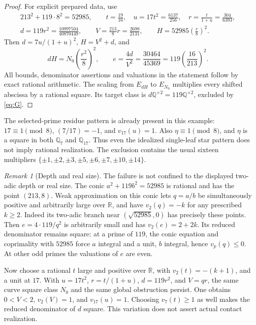 \documentclass[11pt]{article}
\newcommand{\Q}{\mathbb Q}
\theoremstyle{remark}\newtheorem{remark}[theorem]{Remark}
\begin{document}
\begin{proof}
For explicit prepared data, use
\begin{gather*}
 213^2+119\cdot8^2=52985,\qquad
 t=\frac{19}{16},\quad u=17t^2=\frac{6137}{256},\quad
 r=\frac{t}{1+u}=\frac{304}{6393},\\
 d=119r^2=\frac{10997504}{40870449},\qquad
 V=\frac{213}{8}r=\frac{2698}{2131},\qquad
 H=52985\left(\frac r8\right)^2.
\end{gather*}
Then \(d=7u/(1+u)^2\), \(H=V^2+d\), and
\[
 dH=N_0\left(\frac{r^2}{8}\right)^2,
 \qquad e=\frac{4d}{V^2}=\frac{30464}{45369}
                    =119\left(\frac{16}{213}\right)^2.
\]
All bounds, denominator assertions and valuations in the statement follow
by exact rational arithmetic. The scaling from \(E_{dH}\) to \(E_{N_0}\)
multiplies every shifted abscissa by a rational square. Its target class
is \(d\Q^{\times2}=119\Q^{\times2}\), excluded by \eqref{eq:G}.
\end{proof}

The selected-prime residue pattern is already present in this example:
\(17\equiv1\pmod8\), \((7/17)=-1\), and \(v_{17}(u)=1\).
Also \(\eta\equiv1\pmod8\), and \(\eta\) is a square in both
\(\Q_7\) and \(\Q_{17}\). Thus even the idealized single-leaf star
pattern does not imply rational realization. The exclusion contains the
usual sixteen multipliers
\(\{\pm1,\pm2,\pm3,\pm5,\pm6,\pm7,\pm10,\pm14\}\).

\begin{remark}[Depth and real size]
The failure is not confined to the displayed two-adic depth or real size.
The conic \(a^2+119b^2=52985\) is rational and has the point \((213,8)\).
Weak approximation on this conic lets \(q=a/b\) be simultaneously positive
and arbitrarily large over \(\mathbb R\), and have \(v_2(q)=-k\) for
any prescribed \(k\ge2\). Indeed its two-adic branch near
\((\sqrt{52985},0)\) has precisely these points. Then
\(e=4\cdot119/q^2\) is arbitrarily small and has
\(v_2(e)=2+2k\). Its reduced denominator remains square: at a prime
of \(119\), the conic equation and coprimality with \(52985\) force
\(a\) integral and a unit, \(b\) integral, hence \(v_p(q)\le0\).
At other odd primes the valuations of \(e\) are even.

Now choose a rational \(t\) large and positive over \(\mathbb R\), with
\(v_2(t)=-(k+1)\), and a unit at \(17\). With
\(u=17t^2\), \(r=t/(1+u)\), \(d=119r^2\), and \(V=qr\), the same
curve square class \(N_0\) and the same global obstruction persist.
One obtains \(0<V<2\), \(v_2(V)=1\), and \(v_{17}(u)=1\).
Choosing \(v_7(t)\ge1\) as well makes the reduced denominator
of \(d\) square. This variation does not assert actual contact realization.
\end{remark}
\end{document}
